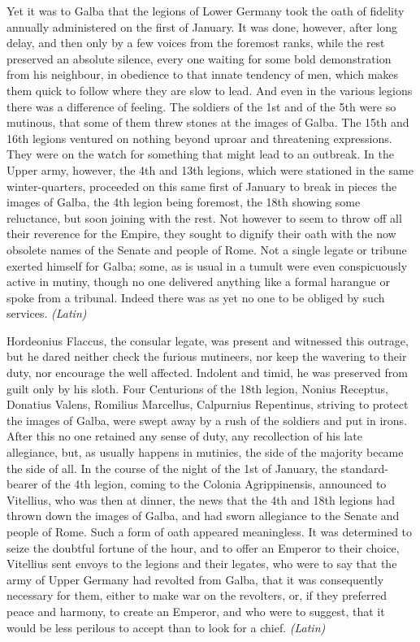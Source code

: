 
Yet it was to Galba that the legions of Lower Germany took the oath of fidelity annually administered on the first of January. It was done, however, after long delay, and then only by a few voices from the foremost ranks, while the rest preserved an absolute silence, every one waiting for some bold demonstration from his neighbour, in obedience to that innate tendency of men, which makes them quick to follow where they are slow to lead. And even in the various legions there was a difference of feeling. The soldiers of the 1st and of the 5th were so mutinous, that some of them threw stones at the images of Galba. The 15th and 16th legions ventured on nothing beyond uproar and threatening expressions. They were on the watch for something that might lead to an outbreak. In the Upper army, however, the 4th and 13th legions, which were stationed in the same winter-quarters, proceeded on this same first of January to break in pieces the images of Galba, the 4th legion being foremost, the 18th showing some reluctance, but soon joining with the rest. Not however to seem to throw off all their reverence for the Empire, they sought to dignify their oath with the now obsolete names of the Senate and people of Rome. Not a single legate or tribune exerted himself for Galba; some, as is usual in a tumult were even conspicuously active in mutiny, though no one delivered anything like a formal harangue or spoke from a tribunal. Indeed there was as yet no one to be obliged by such services. \emph{(Latin)}


Hordeonius Flaccus, the consular legate, was present and witnessed this outrage, but he dared neither check the furious mutineers, nor keep the wavering to their duty, nor encourage the well affected. Indolent and timid, he was preserved from guilt only by his sloth. Four Centurions of the 18th legion, Nonius Receptus, Donatius Valens, Romilius Marcellus, Calpurnius Repentinus, striving to protect the images of Galba, were swept away by a rush of the soldiers and put in irons. After this no one retained any sense of duty, any recollection of his late allegiance, but, as usually happens in mutinies, the side of the majority became the side of all. In the course of the night of the 1st of January, the standard-bearer of the 4th legion, coming to the Colonia Agrippinensis, announced to Vitellius, who was then at dinner, the news that the 4th and 18th legions had thrown down the images of Galba, and had sworn allegiance to the Senate and people of Rome. Such a form of oath appeared meaningless. It was determined to seize the doubtful fortune of the hour, and to offer an Emperor to their choice, Vitellius sent envoys to the legions and their legates, who were to say that the army of Upper Germany had revolted from Galba, that it was consequently necessary for them, either to make war on the revolters, or, if they preferred peace and harmony, to create an Emperor, and who were to suggest, that it would be less perilous to accept than to look for a chief. \emph{(Latin)}

